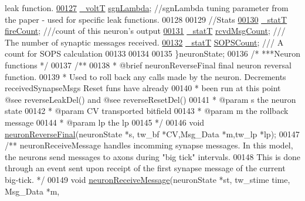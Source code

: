\begin{DoxyCode}
{       leak function.}
\hypertarget{neuron_8h_source_l00127}{}\hyperlink{structneuron_state_a46a71f61511b5311e14643084109d90f}{00127}     \hyperlink{assist_8h_abe1fc1b8f9efd1187e564bcb8de7f815}{\_voltT} \hyperlink{structneuron_state_a46a71f61511b5311e14643084109d90f}{sgnLambda}; \textcolor{comment}{//sgnLambda tuning parameter from the paper - used for
       specific leak functions.}
00128 
00129         \textcolor{comment}{//Stats}
\hypertarget{neuron_8h_source_l00130}{}\hyperlink{structneuron_state_afe8825076c4cf3863c677307fec63c61}{00130}     \hyperlink{assist_8h_ad77e6fc5a9b03d46e7c97b7c4b92e89f}{\_statT} \hyperlink{structneuron_state_afe8825076c4cf3863c677307fec63c61}{fireCount}; \textcolor{comment}{///count of this neuron's output}
\hypertarget{neuron_8h_source_l00131}{}\hyperlink{structneuron_state_ab8f63a1dfdb2992657530ff8a63fdc01}{00131}     \hyperlink{assist_8h_ad77e6fc5a9b03d46e7c97b7c4b92e89f}{\_statT} \hyperlink{structneuron_state_ab8f63a1dfdb2992657530ff8a63fdc01}{rcvdMsgCount}; \textcolor{comment}{/// The number of synaptic messages received.}
\hypertarget{neuron_8h_source_l00132}{}\hyperlink{structneuron_state_a71fbb9a79e8048b473b6e09d29a64bbe}{00132}     \hyperlink{assist_8h_ad77e6fc5a9b03d46e7c97b7c4b92e89f}{\_statT} \hyperlink{structneuron_state_a71fbb9a79e8048b473b6e09d29a64bbe}{SOPSCount}; \textcolor{comment}{/// A count for SOPS calculation}
00133 
00134 
00135 \}neuronState;
00136 \textcolor{comment}{/* ***Neuron functions */}
00137 \textcolor{comment}{/**}
00138 \textcolor{comment}{ * @brief neuronReverseFinal final neuron reversal function.}
00139 \textcolor{comment}{ * Used to roll back any calls made by the neuron. Decrements receivedSynapseMsgs Reset funs have
       already}
00140 \textcolor{comment}{ * been run at this point @see reverseLeakDel() and @see reverseResetDel()}
00141 \textcolor{comment}{ * @param s the neuron state}
00142 \textcolor{comment}{ * @param CV transported bitfield}
00143 \textcolor{comment}{ * @param m the rollback message}
00144 \textcolor{comment}{ * @param lp the lp}
00145 \textcolor{comment}{ */}
00146 \textcolor{keywordtype}{void} \hyperlink{neuron_8h_a01dcc8e3f0132786bd59ecb847013284}{neuronReverseFinal}(neuronState *s, tw\_bf *CV,Msg\_Data *m,tw\_lp *lp);
00147     \textcolor{comment}{/** neuronReceiveMessage handles incomming synapse messages. In this model, the neurons send
       messages to axons during "big tick" intervals. }
00148 \textcolor{comment}{     This is done through an event sent upon receipt of the first synapse message of the current
       big-tick. */}
00149 \textcolor{keywordtype}{void} \hyperlink{neuron_8h_aa6819d7492f0173f2234ba0b8b0bb674}{neuronReceiveMessage}(neuronState *st, tw\_stime time, Msg\_Data *m,

\end{DoxyCode}
